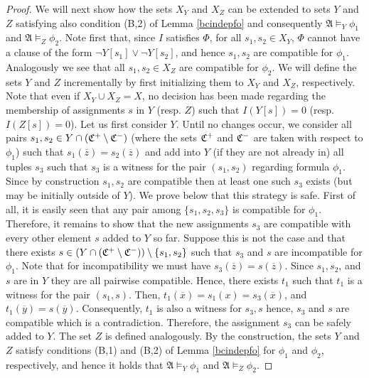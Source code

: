 \documentclass{article}
\theoremstyle{plain}
\theoremstyle{definition}
\newcommand{\mA}{{\mathfrak A}}
\newcommand{\tu}[1]{\overline{#1}}
\begin{document}
\begin{proof}
We will next show how the  sets $X_Y$ and $X_Z$ can be extended to sets $Y$ and $Z$ satisfying also condition (B,2) of Lemma   \ref{bcindepfo} and consequently $\mA \models_Y \phi_1$ and  $\mA \models_Z \phi_2$.
 Note first that, since $I$ satisfies $\Phi$, for all $s_1,s_2\in X_{Y}$, $\Phi$ cannot have a clause of the form $\neg Y[s_1]\vee \neg Y[s_2]$, and hence $s_1,s_2$ are compatible for $\phi_1$. Analogously we see that all  $s_1,s_2\in X_{Z}$ are compatible for  $\phi_2$.
We will define the sets  $Y$ and $Z$ incrementally by first initializing them to  $X_Y$ and $X_Z$, respectively. Note that even if $X_Y\cup X_Z=X$, no decision has been made regarding the membership of   assignments $s$ in $Y$ (resp. $Z$) such that $I(Y[s])=0$ (resp. $I(Z[s])=0$).  Let us first consider $Y$. Until no changes occur,  we consider all pairs $s_1,s_2\in Y\cap (\mathfrak{C}^{+}\setminus\mathfrak{C}^{-})$ (where the sets $\mathfrak{C}^{+}$ and $\mathfrak{C}^{-}$ are taken with respect to $\phi_1$) such that  $s_1(\tu z)= s_2(\tu z)$  and add into $Y$ (if they are not already in) all tuples $s_3$ such that $s_3$ is a witness for the pair $(s_1,s_2)$ regarding formula $\phi_1$. Since by construction $s_1,s_2$ are compatible then at least one such  $s_3$ exists (but may be initially outside of $Y$). We prove below that this strategy is safe.
First of all, it is  easily seen that any pair among $\{s_1,s_2,s_3\}$ is compatible for $\phi_1$. Therefore, it remains to show that the new assignments $s_3$  are compatible with every other element $s$ added to $Y$ so far. Suppose this is not the case and that there exists $s\in (Y \cap (\mathfrak{C}^{+}\setminus\mathfrak{C}^{-})) \setminus \{s_1,s_2\}$ such that $s_3$ and $s$ are incompatible for $\phi_1$. Note that  for incompatibility we  must have $s_3(\tu z)=s(\tu z)$. Since $s_1,s_2$, and $s$ are in $Y$ they are all pairwise compatible. Hence, there exists $t_1$ such that $t_1$ is a witness for the pair $(s_1,s)$.
Then,  $t_1(\tu x)=s_1(x)=s_3(\tu x)$, and  $t_1(\tu y)=s(\tu y)$. Consequently, $t_1$ is also a witness for $s_3,s$ hence, $s_3$ and $s$ are compatible which is a contradiction. Therefore,  the assignment $s_3$  can be safely added to $Y$. The set  $Z$ is defined analogously. By the construction,  the sets $Y$ and $Z$ satisfy conditions (B,1) and (B,2) of Lemma   \ref{bcindepfo} for $\phi_1$ and $\phi_2$, respectively,  and hence it holds that  $\mA \models_Y \phi_1$  and  $\mA\models_Z \phi_2$.
  
 




\end{proof}
\end{document}
